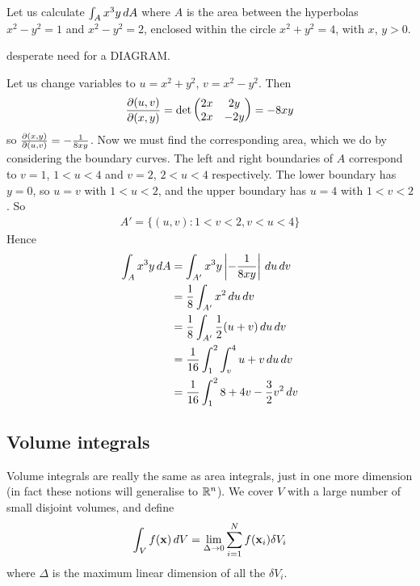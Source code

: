 \documentclass{../template/note}
\begin{document}
    \begin{example*}
        Let us calculate \(\int_A x^3y \,d{A}\) where \(A\) is the area between the hyperbolas \(x^2 - y^2 = 1\) and \(x^2 - y^2 = 2\), enclosed within the circle \(x^2 + y^2 = 4\), with \(x\), \(y > 0\).

        desperate need for a DIAGRAM.

        Let us change variables to \(u = x^2 + y^2\), \(v = x^2 - y^2\). Then
        \begin{align*}
            \pd{(u, v)}{(x, y)} = \det \begin{pmatrix}
             2x & 2y \\
             2x & -2y \\
            \end{pmatrix} = -8xy
        \end{align*}
        so \(\pd{(x, y)}{(u, v)} = -\frac 1 {8xy}\). Now we must find the corresponding area, which we do by considering the boundary curves. The left and right boundaries of \(A\) correspond to \(v = 1\), \(1 < u < 4\) and \(v = 2\), \(2 < u < 4\) respectively. The lower boundary has \(y = 0\), so \(u = v\) with \(1 < u < 2\), and the upper boundary has \(u = 4\) with \(1 < v < 2\). So
        \begin{align*}
            A' = \{(u, v) : 1 < v < 2, v < u < 4\}
        \end{align*}
        Hence
        \begin{align*}
            \int_A x^3 y \,d{A} &= \int_{A'} x^3y \left|-\frac 1 {8xy}\right| \,d{u} \, dv \\
            &= \frac 1 8 \int_{A'} x^2 \,d{u} \, dv \\
            &= \frac 1 8 \int_{A'} \frac 1 2 (u + v) \,d{u} \, dv \\
            &= \frac 1 {16} \int_1^2 \int_v^4 u + v \,d{u} \, dv \\
            &= \frac 1 {16} \int_1^2 8 + 4v - \frac 3 2 v^2 \,d{v}
        \end{align*}
    \end{example*}
    
    \subsection{Volume integrals}

    Volume integrals are really the same as area integrals, just in one more dimension (in fact these notions will generalise to \(\mathbb R^n\)). We cover \(V\) with a large number of small disjoint volumes, and define
    \begin{align*}
        \int_V f(\V x) \D V = \lim_{\Delta \to 0} \sum_{i=1}^N f(\V x_i) \delta V_i
    \end{align*}
    where \(\Delta\) is the maximum linear dimension of all the \(\delta V_i\).
\end{document}
